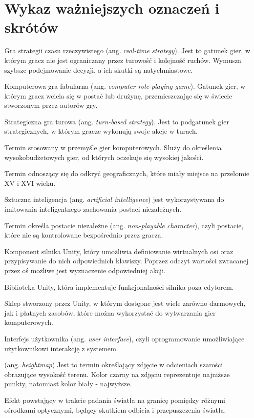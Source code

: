 \chapter*{Wykaz ważniejszych oznaczeń i skrótów}
\begin{description}[style=multiline,leftmargin=3cm]
\item[RTS] Gra strategii czasu rzeczywistego (ang. \textit{real-time strategy}). Jest to gatunek gier, w którym gracz nie jest
ograniczany przez turowość i kolejność ruchów. Wymusza szybsze podejmowanie decyzji, a ich skutki są natychmiastowe.
\item[cRPG] Komputerowa gra fabularna (ang. \textit{computer role-playing game}). Gatunek gier, w którym gracz wciela
się w postać lub drużynę, przemieszczając się w świecie stworzonym przez autorów gry.
\item[TBS] Strategiczna gra turowa (ang. \textit{turn-based strategy}). Jest to podgatunek gier strategicznych, w którym
gracze wykonują swoje akcje w turach.
\item[AAA (Triple-A)] Termin stosowany w przemyśle gier komputerowych. Służy do określenia wysokobudżetowych gier, od
których oczekuje się wysokiej jakości.
\item[Wielkie odkrycia geograficzne] Termin odnoszący się do odkryć geograficznych, które miały miejsce na przełomie XV
i XVI wieku.
\item[AI] Sztuczna inteligencja (ang. \textit{artificial intelligence}) jest wykorzystywana do imitowania inteligentnego
zachowania postaci niezależnych.
\item[NPC] Termin określa postacie niezależne (ang. \textit{non-playable character}), czyli postacie, które nie są kontrolowane bezpośrednio
przez gracza.
\item[Input Manager] Komponent silnika Unity, który umożliwia definiowanie wirtualnych osi oraz przypisywanie do nich
odpowiednich klawiszy. Poprzez odczyt wartości zwracanej przez oś możliwe jest wyznaczenie odpowiedniej akcji.
\item[Unity Runtime] Biblioteka Unity, która implementuje funkcjonalności silnika poza edytorem.
\item[Asset Store] Sklep stworzony przez Unity, w którym dostępne jest wiele zarówno darmowych, jak i płatnych zasobów,
które można wykorzystać do wytwarzania gier komputerowych.
\item[UI] Interfejs użytkownika (ang. \textit{user interface}), czyli oprogramowanie umożliwiające użytkownikowi
interakcję z systemem.
\item[mapa wysokości] (ang. \textit{heightmap}) Jest to termin określający zdjęcie w odcieniach szarości obrazujące
wysokość terenu. Kolor czarny na zdjęciu reprezentuje najniższe punkty, natomiast kolor biały - najwyższe.
\item[efekt Fresnela] Efekt powstający w trakcie padania światła na granicę pomiędzy różnymi ośrodkami optycznymi,
będący skutkiem odbicia i przepuszczenia światła.
\end{description}
